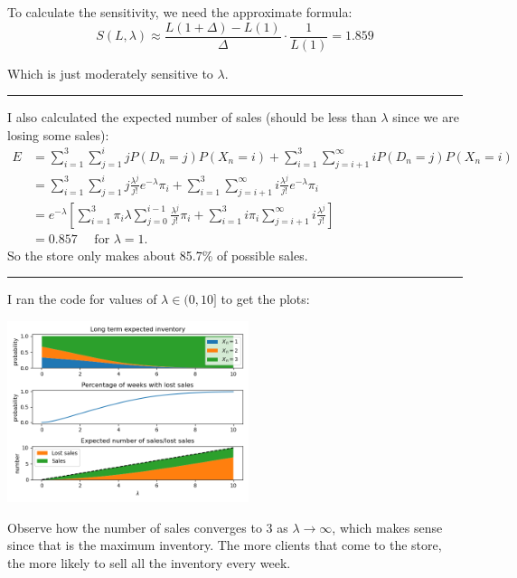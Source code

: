 \begin{solution}
\begin{slide}
\begin{parts}
	\item To calculate the sensitivity, we need the approximate formula:
	\[
	S(L,\lambda) \approx \frac{L(1+\Delta)-L(1)}{\Delta} \cdot \frac{1}{L(1)} = 1.859
	\]
	
	Which is just moderately sensitive to $\lambda$.

\end{parts}

\rule{\textwidth}{0.4pt}

I also calculated the expected number of sales (should be less than $\lambda$ since we are losing some sales):
\begin{align*}
E %
	& = \sum_{i=1}^3 \sum_{j=1}^i j P(D_n=j) P(X_n=i) + \sum_{i=1}^3 \sum_{j=i+1}^\infty i P(D_n=j) P(X_n=i)\\
 & = \sum_{i=1}^3 \sum_{j=1}^i j \frac{\lambda^j}{j!} e^{-\lambda}\pi_i + \sum_{i=1}^3 \sum_{j=i+1}^\infty i \frac{\lambda^j}{j!} e^{-\lambda} \pi_i \\
 & = e^{-\lambda} \left[\sum_{i=1}^3 \pi_i \lambda \sum_{j=0}^{i-1} \frac{\lambda^j}{j!} \pi_i + \sum_{i=1}^3 i \pi_i \sum_{j=i+1}^\infty i \frac{\lambda^j}{j!} \right] \\ 
 & = 0.857 \quad \text{ for }\lambda=1.
\end{align*}
So the store only makes about 85.7\% of possible sales.

\rule{\textwidth}{0.4pt}

I ran the code for values of $\lambda \in (0,10]$ to get the plots:

\begin{center}
	\includegraphics[width=200pt]{images/aquarium.png}
\end{center}

Observe how the number of sales converges to $3$ as $\lambda \to \infty$, which makes sense since that is the maximum inventory. The more clients that come to the store, the more likely to sell all the inventory every week.


	
\end{slide}

\end{solution}



